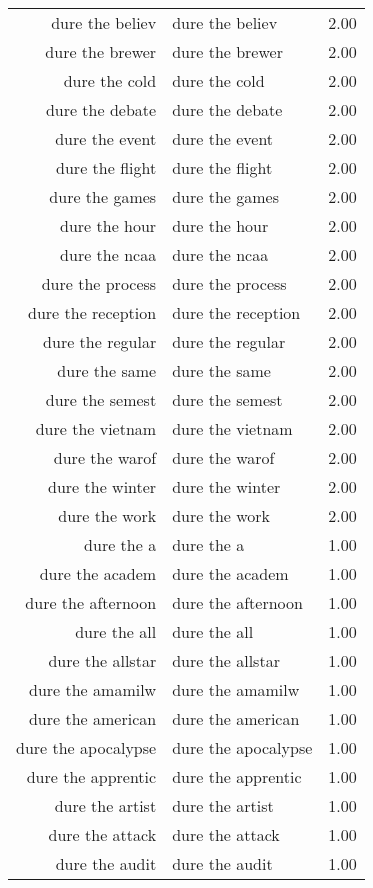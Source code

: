 \begin{table}[ht]
\begin{tabular}{rlr}
  dure the believ & dure the believ & 2.00 \\ 
  dure the brewer & dure the brewer & 2.00 \\ 
  dure the cold & dure the cold & 2.00 \\ 
  dure the debate & dure the debate & 2.00 \\ 
  dure the event & dure the event & 2.00 \\ 
  dure the flight & dure the flight & 2.00 \\ 
  dure the games & dure the games & 2.00 \\ 
  dure the hour & dure the hour & 2.00 \\ 
  dure the ncaa & dure the ncaa & 2.00 \\ 
  dure the process & dure the process & 2.00 \\ 
  dure the reception & dure the reception & 2.00 \\ 
  dure the regular & dure the regular & 2.00 \\ 
  dure the same & dure the same & 2.00 \\ 
  dure the semest & dure the semest & 2.00 \\ 
  dure the vietnam & dure the vietnam & 2.00 \\ 
  dure the warof & dure the warof & 2.00 \\ 
  dure the winter & dure the winter & 2.00 \\ 
  dure the work & dure the work & 2.00 \\ 
  dure the a & dure the a & 1.00 \\ 
  dure the academ & dure the academ & 1.00 \\ 
  dure the afternoon & dure the afternoon & 1.00 \\ 
  dure the all & dure the all & 1.00 \\ 
  dure the allstar & dure the allstar & 1.00 \\ 
  dure the amamilw & dure the amamilw & 1.00 \\ 
  dure the american & dure the american & 1.00 \\ 
  dure the apocalypse & dure the apocalypse & 1.00 \\ 
  dure the apprentic & dure the apprentic & 1.00 \\ 
  dure the artist & dure the artist & 1.00 \\ 
  dure the attack & dure the attack & 1.00 \\ 
  dure the audit & dure the audit & 1.00 \\ 

\end{tabular}
\end{table}
